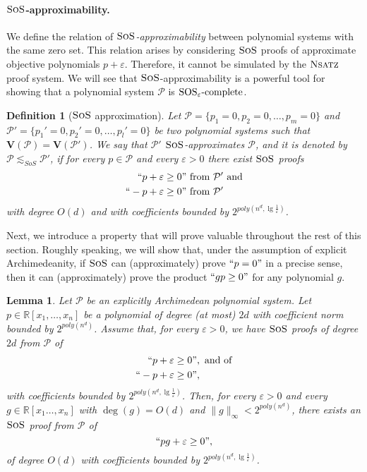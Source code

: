\documentclass[11pt]{article}
\newcommand{\sos}{\text{\sc{SoS}}}
\newcommand{\Nsatz}{\textsc{Nsatz}}
\newcommand{\Variety}[1]{{\textbf{V}}\left( #1 \right)}
\newcommand{\1}{\textbf{1}}
\newtheorem{lemma}[theorem]{Lemma}
\newtheorem{definition}[theorem]{Definition}
\newcommand{\SOSe}{\rm{SOS}_\varepsilon\text{-complete}}
\begin{document}
\paragraph{$\sos$-approximability.}
We define the relation of \emph{$\sos$-approximability} between polynomial systems with the same zero set. This relation arises by considering $\sos$ proofs of approximate objective polynomials $p + \varepsilon$. Therefore, it cannot be simulated by the $\Nsatz$ proof system. We will see that $\sos$-approximability is a powerful tool for showing that a polynomial system $\mathcal{P}$ is $\SOSe$.
\begin{definition}[$\sos$ approximation]\label{def:sos_approx}
     Let $\mathcal{P}=\{p_1 = 0,p_2=0, \dots, p_m=0\}$ and $\mathcal{P}'=\{p_1'=0, p_2'=0, \dots, p_l'=0\}$ be two polynomial systems such that $\Variety{\mathcal{P}} = \Variety{\mathcal{P}'}$. We say that \emph{$\mathcal{P}'$ $\sos$-approximates $\mathcal{P}$}, and it is denoted by $\mathcal{P} \lesssim_{SoS} \mathcal{P}'$, if for every $p \in \mathcal{P}$ and every $\varepsilon >0$ there exist $\sos$ proofs
    \begin{align}
      \begin{split}
    ``p + \varepsilon \geq 0&"  \text{ from }\mathcal{P}' \text{ and}\\
    ``-p + \varepsilon \geq 0&" \text{ from } \mathcal{P}'     
      \end{split}
    \end{align} 
    with degree $O(d)$ and with coefficients bounded by $2^{poly(n^d, \lg \frac{1}{\varepsilon})}$.
\end{definition}

Next, we introduce a property that will prove valuable throughout the rest of this section. Roughly speaking, we will show that, under the assumption of explicit Archimedeanity, if $\sos$ can (approximately) prove $``p=0"$ in a precise sense, then it can (approximately) prove the product $``gp \geq 0"$ for any polynomial $g$.

\begin{lemma}\label{lemma-pg-e}
    Let $\mathcal{P}$ be an explicitly Archimedean polynomial system. Let $p \in \mathbb{R}[x_1,\ldots,x_n]$ be a polynomial of degree (at most) $2d$ with coefficient norm bounded by $2^{poly(n^d)}$.
    Assume that, for every $\varepsilon>0$, we have $\sos$ proofs of degree $2d$ from $\mathcal{P}$ of
    \begin{align}
      \begin{split}
          ``p + \varepsilon &\geq 0", \text{ and of} \\
          ``-p + \varepsilon &\geq 0",      
      \end{split}
    \end{align} 
    with coefficients bounded by $2^{poly(n^d, \lg \frac{1}{\varepsilon})}$. Then, for every $\varepsilon>0$ and every $g \in \mathbb{R}[x_1 \dots, x_n]$ with $\deg(g) = O(d)$ and $\| g \|_{\infty} < 2^{poly(n^d)}$, there exists an $\sos$ proof from $\mathcal{P}$ of  
    $$`` pg + \varepsilon \geq 0",$$
    of degree $O(d)$ with coefficients bounded by $2^{poly(n^d, \lg \frac{1}{\varepsilon})}$.
\end{lemma}
\end{document}
